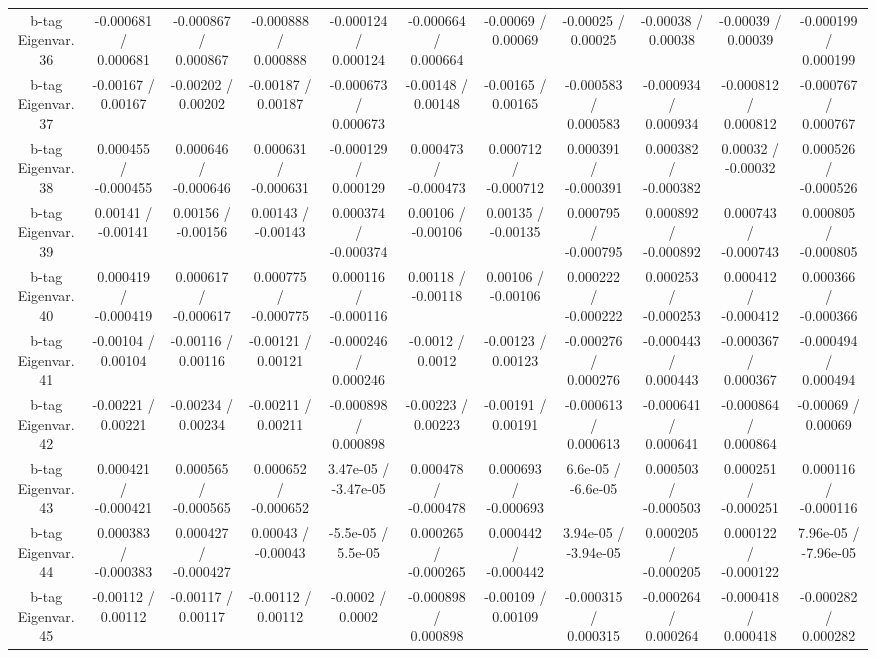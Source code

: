 \begin{table}[htbp]
\begin{center}
\begin{tabular}{|c|c|c|c|c|c|c|c|c|c|c|}
  b-tag Eigenvar. 36 & -0.000681 / 0.000681 & -0.000867 / 0.000867 & -0.000888 / 0.000888 & -0.000124 / 0.000124 & -0.000664 / 0.000664 & -0.00069 / 0.00069 & -0.00025 / 0.00025 & -0.00038 / 0.00038 & -0.00039 / 0.00039 & -0.000199 / 0.000199 \\ 
  b-tag Eigenvar. 37 & -0.00167 / 0.00167 & -0.00202 / 0.00202 & -0.00187 / 0.00187 & -0.000673 / 0.000673 & -0.00148 / 0.00148 & -0.00165 / 0.00165 & -0.000583 / 0.000583 & -0.000934 / 0.000934 & -0.000812 / 0.000812 & -0.000767 / 0.000767 \\ 
  b-tag Eigenvar. 38 & 0.000455 / -0.000455 & 0.000646 / -0.000646 & 0.000631 / -0.000631 & -0.000129 / 0.000129 & 0.000473 / -0.000473 & 0.000712 / -0.000712 & 0.000391 / -0.000391 & 0.000382 / -0.000382 & 0.00032 / -0.00032 & 0.000526 / -0.000526 \\ 
  b-tag Eigenvar. 39 & 0.00141 / -0.00141 & 0.00156 / -0.00156 & 0.00143 / -0.00143 & 0.000374 / -0.000374 & 0.00106 / -0.00106 & 0.00135 / -0.00135 & 0.000795 / -0.000795 & 0.000892 / -0.000892 & 0.000743 / -0.000743 & 0.000805 / -0.000805 \\ 
  b-tag Eigenvar. 40 & 0.000419 / -0.000419 & 0.000617 / -0.000617 & 0.000775 / -0.000775 & 0.000116 / -0.000116 & 0.00118 / -0.00118 & 0.00106 / -0.00106 & 0.000222 / -0.000222 & 0.000253 / -0.000253 & 0.000412 / -0.000412 & 0.000366 / -0.000366 \\ 
  b-tag Eigenvar. 41 & -0.00104 / 0.00104 & -0.00116 / 0.00116 & -0.00121 / 0.00121 & -0.000246 / 0.000246 & -0.0012 / 0.0012 & -0.00123 / 0.00123 & -0.000276 / 0.000276 & -0.000443 / 0.000443 & -0.000367 / 0.000367 & -0.000494 / 0.000494 \\ 
  b-tag Eigenvar. 42 & -0.00221 / 0.00221 & -0.00234 / 0.00234 & -0.00211 / 0.00211 & -0.000898 / 0.000898 & -0.00223 / 0.00223 & -0.00191 / 0.00191 & -0.000613 / 0.000613 & -0.000641 / 0.000641 & -0.000864 / 0.000864 & -0.00069 / 0.00069 \\ 
  b-tag Eigenvar. 43 & 0.000421 / -0.000421 & 0.000565 / -0.000565 & 0.000652 / -0.000652 & 3.47e-05 / -3.47e-05 & 0.000478 / -0.000478 & 0.000693 / -0.000693 & 6.6e-05 / -6.6e-05 & 0.000503 / -0.000503 & 0.000251 / -0.000251 & 0.000116 / -0.000116 \\ 
  b-tag Eigenvar. 44 & 0.000383 / -0.000383 & 0.000427 / -0.000427 & 0.00043 / -0.00043 & -5.5e-05 / 5.5e-05 & 0.000265 / -0.000265 & 0.000442 / -0.000442 & 3.94e-05 / -3.94e-05 & 0.000205 / -0.000205 & 0.000122 / -0.000122 & 7.96e-05 / -7.96e-05 \\ 
  b-tag Eigenvar. 45 & -0.00112 / 0.00112 & -0.00117 / 0.00117 & -0.00112 / 0.00112 & -0.0002 / 0.0002 & -0.000898 / 0.000898 & -0.00109 / 0.00109 & -0.000315 / 0.000315 & -0.000264 / 0.000264 & -0.000418 / 0.000418 & -0.000282 / 0.000282 \\ 

\end{tabular}
\end{center}
\end{table}
